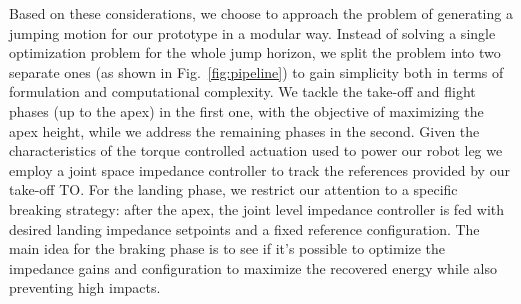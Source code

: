 Based on these considerations, we choose to approach the problem of generating a jumping motion for our prototype in a modular way. Instead of solving a single optimization problem for the whole jump horizon, we split the problem into two separate ones (as shown in Fig.~\ref{fig:pipeline}) to gain simplicity both in terms of formulation and computational complexity. We tackle the take-off and flight phases (up to the apex) in the first one, with the objective of maximizing the apex height, while we address the remaining phases in the second. Given the characteristics of the torque controlled actuation used to power our robot leg we employ a joint space impedance controller to track the references provided by our take-off TO. For the landing phase, we restrict our attention to a specific breaking strategy: after the apex, the joint level impedance controller is fed with desired landing impedance setpoints and a fixed reference configuration. The main idea for the braking phase is to see if it's possible to optimize the impedance gains and configuration to maximize the recovered energy while also preventing high impacts.

